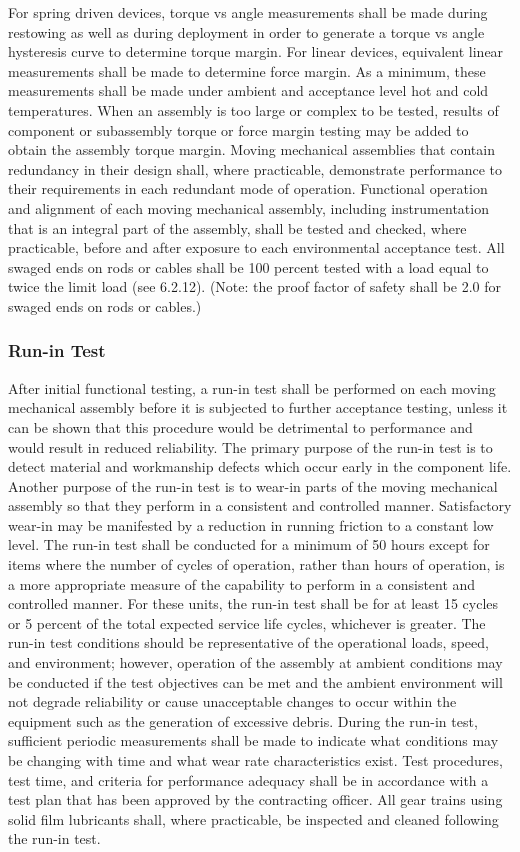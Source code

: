 \documentclass[12pt]{article}
\begin{document}
For spring driven devices, torque vs angle measurements shall be made during restowing as well as during deployment in order to generate a torque vs angle hysteresis curve to determine torque margin.
For linear devices, equivalent linear measurements shall be made to determine force margin. 
As a minimum, these measurements shall be made under ambient and acceptance level hot and cold temperatures. 
When an assembly is too large or complex to be tested, results of component or subassembly torque or force margin testing may be added to obtain the assembly torque margin. 
Moving mechanical assemblies that contain redundancy in their design shall, where practicable, demonstrate performance to their requirements in each redundant mode of operation. 
Functional operation and alignment of each moving mechanical assembly, including instrumentation that is an integral part of the assembly, shall be tested and checked, where practicable, before and after exposure to each environmental acceptance test. 
All swaged ends on rods or cables shall be 100 percent tested with a load equal to twice the limit load (see 6.2.12). 
(Note: the proof factor of safety shall be 2.0 for swaged ends on rods or cables.)

\subsubsection{Run-in Test} %
After initial functional testing, a run-in test shall be performed on each moving mechanical assembly before it is subjected to further acceptance testing, unless it can be shown that this procedure would be detrimental to performance and would result in reduced reliability. 
The primary purpose of the run-in test is to detect material and workmanship defects which occur early in the component life. 
Another purpose of the run-in test is to wear-in parts of the moving mechanical assembly so that they perform in a consistent and controlled manner. 
Satisfactory wear-in may be manifested by a reduction in running friction to a constant low level. 
The run-in test shall be conducted for a minimum of 50 hours except for items where the number of cycles of operation, rather than hours of operation, is a more appropriate measure of the capability to perform in a consistent and controlled manner. 
For these units, the run-in test shall be for at least 15 cycles or 5 percent of the total expected service life cycles, whichever is greater. 
The run-in test conditions should be representative of the operational loads, speed, and environment; however, operation of the assembly at ambient conditions may be conducted if the test objectives can be met and the ambient environment will not degrade reliability or cause unacceptable changes to occur within the equipment such as the generation of excessive debris. 
During the run-in test, sufficient periodic measurements shall be made to indicate what conditions may be changing with time and what wear rate characteristics exist. 
Test procedures, test time, and criteria for performance adequacy shall be in accordance with a test plan that has been approved by the contracting officer. 
All gear trains using solid film lubricants shall, where practicable, be inspected and cleaned following the run-in test.
\end{document}
